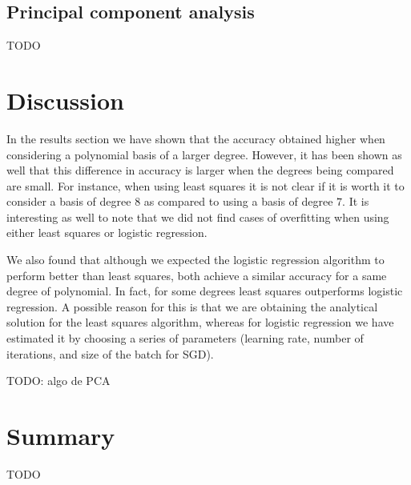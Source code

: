 \documentclass[10pt,conference,compsocconf]{IEEEtran}
\begin{document}
  \subsection{Principal component analysis} %
  \label{sub:principal_component_analysis}
    TODO

\section{Discussion}
\label{sec:discussion}
  In the results section we have shown that the accuracy obtained higher when considering a polynomial basis of a larger degree. However, it has been shown as well that this difference in accuracy is larger when the degrees being compared are small. For instance, when using least squares it is not clear if it is worth it to consider a basis of degree $8$ as compared to using a basis of degree $7$. It is interesting as well to note that we did not find cases of overfitting when using either least squares or logistic regression.

  We also found that although we expected the logistic regression algorithm to perform better than least squares, both achieve a similar accuracy for a same degree of polynomial. In fact, for some degrees least squares outperforms logistic regression. A possible reason for this is that we are obtaining the analytical solution for the least squares algorithm, whereas for logistic regression we have estimated it by choosing a series of parameters (learning rate, number of iterations, and size of the batch for SGD).

  TODO: algo de PCA

\section{Summary}
\label{sec:tips-writing}

TODO



\end{document}
